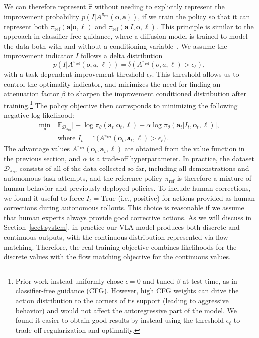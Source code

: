 \documentclass[conference]{IEEEtran}
\newcommand{\ba}{\mathbf{a}}
\newcommand{\bo}{\mathbf{o}}
\newcommand{\lang}{\ell}
\newcommand{\piref}{\pi_\text{ref}}
\begin{document}
We can therefore represent $\hat{\pi}$ without needing to explicitly represent the improvement probability $p(I | A^{\piref}(\bo, \ba))$, if we train the policy so that it can represent both $\piref(\ba | \bo, \lang)$ and $\piref(\ba | I, \bo, \lang)$. This principle is similar to the approach in classifier-free guidance, where a diffusion model is trained to model the data both with and without a conditioning variable~\citep{Frans2025DiffusionGuidance}.
We assume the improvement indicator $I$ follows a delta distribution $$
p(I | A^{\piref}(o, a, \lang)) = \delta (A^{\piref}(o, a, \lang) > \epsilon_\lang),
$$ with a task dependent improvement threshold $\epsilon_\lang$. This threshold allows us to control the optimality indicator, and minimizes the need for finding an attenuation factor $\beta$ to sharpen the improvement conditioned distribution after training.\footnote{Prior work \citep{Frans2025DiffusionGuidance} instead uniformly chose $\epsilon = 0$ and tuned $\beta$ at test time, as in classifier-free guidance (CFG). However, high CFG weights can drive the action distribution to the corners of its support (leading to aggressive behavior) and would not affect the autoregressive part of the model. We found it easier to obtain good results by instead using the threshold $\epsilon_\lang$ to trade off regularization and optimality.} The policy objective then corresponds to minimizing the following negative log-likelihood:
\begin{equation}
\begin{aligned}
\min_\theta \: &\mathbb{E}_{\mathcal{D}_{\piref}} \Big[ -\log \pi_\theta(\ba_t | \bo_t, \lang) - \alpha  \log \pi_\theta(\ba_t | I_t, \bo_t, \lang)\Big], \\
 & \text{where } I_t = \mathds{1}\big(A^{\piref}(\bo_t, \ba_t, \lang) > \epsilon_\lang \big).
\end{aligned}
\label{eq:obj_adv_cond}
\end{equation}
The advantage values $A^{\piref}(\bo_t, \ba_t, \lang)$ are obtained from the value function in the previous section, and $\alpha$ is a trade-off hyperparameter. In practice, the dataset $\mathcal{D}_{\piref}$ consists of all of the data collected so far, including all demonstrations and autonomous task attempts, and the reference policy $\piref$ is therefore a mixture of human behavior and previously deployed policies. To include human corrections, we found it useful to force $I_t = \text{True}$ (i.e., positive) for actions provided as human corrections during autonomous rollouts. This choice is reasonable if we assume that human experts always provide good corrective actions. As we will discuss in Section~\ref{sect:system}, in practice our VLA model produces both discrete and continuous outputs, with the continuous distribution represented via flow matching. Therefore, the real training objective combines likelihoods for the discrete values with the flow matching objective for the continuous values.
\end{document}
